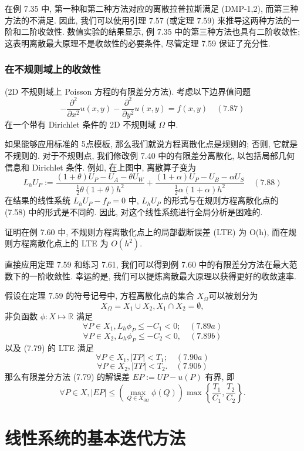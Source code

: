 \documentclass[a4paper]{ctexart}
\newcommand{\hl}[1]
{\noindent {\bf {#1}}}
\begin{document}
{在例 7.35 中, 第一种和第二种方法对应的离散拉普拉斯满足 (DMP-1,2), 
而第三种方法的不满足. 因此, 我们可以使用引理 7.57 (或定理 7.59) 
来推导这两种方法的一阶和二阶收敛性. 
数值实验的结果显示, 例 7.35 中的第三种方法也具有二阶收敛性; 
这表明离散最大原理不是收敛性的必要条件, 尽管定理 7.59 保证了充分性.

\subsubsection{在不规则域上的收敛性}

\hl{例 7.60} (2D 不规则域上 Poisson 方程的有限差分方法). 考虑以下边界值问题
$$
-\frac{\partial^2}{\partial x^2}u(x, y) 
-\frac{\partial^2}{\partial y^2}u(x, y) = f(x, y) \quad (7.87)
$$
在一个带有 Dirichlet 条件的 2D 不规则域 $\Omega$ 中.

如果能够应用标准的 5点模板, 那么我们就说方程离散化点是规则的; 否则, 它就是不规则的. 
对于不规则点, 我们修改例 7.40 中的有限差分离散化, 
以包括局部几何信息和 Dirichlet 条件. 例如, 在上图中, 离散算子变为
$$
L_hU_P :=
\frac{(1 + \theta)U_P - U_A - \theta U_W}{\frac{1}{2}\theta(1 + \theta)h^2}
+
\frac{(1 + \alpha)U_P - U_B - \alpha U_S}{\frac{1}{2}\alpha(1 + \alpha)h^2}
\quad
(7.88)
$$
在结果的线性系统 $L_hU_P - f_P = 0$ 中, $L_hU_P$ 的形式与在规则方程离散化点的 (7.58) 
中的形式是不同的. 因此, 对这个线性系统进行全局分析是困难的. 

\hl{习题 7.61} 证明在例 7.60 中, 
不规则方程离散化点上的局部截断误差 (LTE) 为 O(h), 
而在规则方程离散化点上的 LTE 为 $O(h^2)$.

直接应用定理 7.59 和练习 7.61, 
我们可以得到例 7.60 中的有限差分方法在最大范数下的一阶收敛性. 
幸运的是, 我们可以提炼离散最大原理以获得更好的收敛速率.

\hl{定理 7.62} 假设在定理 7.59 的符号记号中, 方程离散化点的集合 
$X_{\Omega}$可以被划分为
$$
X_{\Omega} = X_1 \cup X_2, X_1 \cap X_2 = \emptyset,
$$
非负函数 $\phi : X \mapsto \mathbb{R}$ 满足
$$
\forall P \in X_1, L_h\phi_P \leq -C_1 < 0; \quad (7.89a)
$$
$$
\forall P \in X_2, L_h\phi_P \leq -C_2 < 0, \quad (7.89b)
$$
以及 (7.79) 的 LTE 满足
$$
\forall P \in X_1, |TP| < T_1; \quad (7.90a)
$$
$$
\forall P \in X_2, |TP| < T_2. \quad (7.90b)
$$
那么有限差分方法 (7.79) 的解误差 $EP := UP - u(P)$ 有界, 即
$$
\forall P \in X, |EP| \leq 
\left(\max_{Q\in X_{\partial \Omega}}
\phi(Q) \right)
\max \left\{\frac{T_1}{C_1}, \frac{T_2}{C_2}\right\}.
$$

\section{线性系统的基本迭代方法}

}
\end{document}

